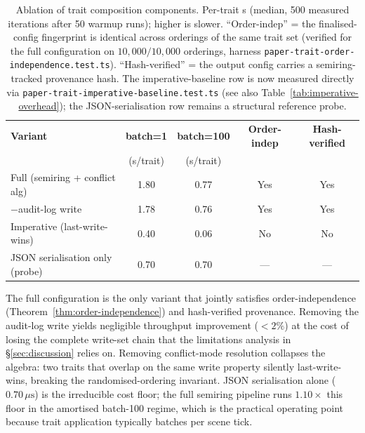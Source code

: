 \documentclass[sigconf,nonacm]{acmart}
\providecommand{\measuredFrom}[1]{}
\begin{document}
\begin{table}[t]
\centering
\caption{Ablation of trait composition components. Per-trait \textmu{}s
(median, 500 measured iterations after 50 warmup runs); higher is slower.
``Order-indep'' = the finalised-config fingerprint is identical across
orderings of the same trait set (verified for the full configuration on
$10{,}000/10{,}000$ orderings, harness
\texttt{paper-trait-order-independence.test.ts}). ``Hash-verified'' = the
output config carries a semiring-tracked provenance hash.
The imperative-baseline row is now measured directly via
\texttt{paper-trait-imperative-baseline.test.ts} (see also
Table~\ref{tab:imperative-overhead}); the JSON-serialisation row remains a
structural reference probe.}
\label{tab:ablation}
\small
\measuredFrom{HoloScript/packages/core/src/traits/constants/__tests__/paper-trait-semiring-overhead.test.ts}%
\measuredFrom{HoloScript/packages/core/src/traits/constants/__tests__/paper-trait-imperative-baseline.test.ts}%
\measuredFrom{HoloScript/packages/core/src/traits/constants/__tests__/paper-trait-order-independence.test.ts}%
\measuredFrom{HoloScript/.bench-logs/paper-trait-semiring-overhead.json}%
\begin{tabular}{lcccc}
\toprule
\textbf{Variant} & \textbf{batch=1} & \textbf{batch=100} & \textbf{Order-indep} & \textbf{Hash-verified} \\
                 & (\textmu{}s/trait) & (\textmu{}s/trait) &  &  \\
\midrule
Full (semiring + conflict alg)        & 1.80 & 0.77 & Yes & Yes \\
$-$audit-log write                     & 1.78 & 0.76 & Yes & Yes \\
Imperative (last-write-wins)          & 0.40 & 0.06 & No  & No  \\
JSON serialisation only (probe)       & 0.70 & 0.70 & ---  & --- \\
\bottomrule
\end{tabular}
\end{table}

The full configuration is the only variant that jointly satisfies
order-independence (Theorem~\ref{thm:order-independence}) and hash-verified
provenance.  Removing the audit-log write yields negligible throughput
improvement ($<\!2\%$) at the cost of losing the complete write-set chain
that the limitations analysis in \S\ref{sec:discussion} relies on.
Removing conflict-mode resolution collapses the algebra: two traits that
overlap on the same write property silently last-write-wins, breaking the
randomised-ordering invariant.  JSON serialisation alone
($0.70\,\mu\text{s}$) is the irreducible cost floor; the full semiring
pipeline runs $1.10\times$ this floor in the amortised batch-100 regime,
which is the practical operating point because trait application typically
batches per scene tick.
\end{document}
